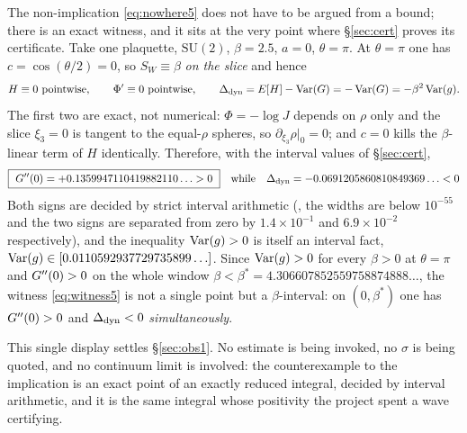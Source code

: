 The non-implication \eqref{eq:nowhere5} does not have to be argued from a bound; there is an
exact witness, and it sits at the very point where \S\ref{sec:cert} proves its certificate. Take
one plaquette, $\mathrm{SU}(2)$, $\beta=2.5$, $a=0$, $\theta=\pi$. At $\theta=\pi$ one has
$c=\cos(\theta/2)=0$, so $S_W\equiv\beta$ \emph{on the slice} and hence
\begin{equation}
H\equiv0\ \text{pointwise},\qquad
\Phi'\equiv0\ \text{pointwise},\qquad
\Dyn=E[H]-\Var(G)=-\Var(G)=-\beta^{2}\Var(g).
\label{eq:wit5}
\end{equation}
The first two are exact, not numerical: $\Phi=-\log J$ depends on $\rho$ only and the slice
$\xi_3=0$ is tangent to the equal-$\rho$ spheres, so $\partial_{\xi_3}\rho|_{0}=0$; and $c=0$ kills
the $\beta$-linear term of $H$ identically. Therefore, with the interval values of
\S\ref{sec:cert},
\begin{equation}
\boxed{\ \Gpp=+0.1359947110419882110\ldots>0\ }
\quad\text{while}\quad
\Dyn=-0.0691205860810849369\ldots<0
\label{eq:witness5}
\end{equation}
Both signs are decided by strict interval arithmetic (\LT, the widths are below $10^{-55}$ and the
two signs are separated from zero by $1.4\times10^{-1}$ and $6.9\times10^{-2}$ respectively), and
the inequality $\operatorname{Var}(g)>0$ is itself an interval fact,
$\operatorname{Var}(g)\in[0.0110592937729735899\ldots]$. Since $\operatorname{Var}(g)>0$ for every $\beta>0$ at $\theta=\pi$
and $G''(0)>0$ on the whole window $\beta<\beta^{*}=4.306607852559758874888\ldots$, the witness
\eqref{eq:witness5} is not a single point but a $\beta$-interval: on
$(0,\beta^{*})$ one has $G''(0)>0$ and $\Delta_{\mathrm{dyn}}<0$ \emph{simultaneously}. \LT{}


This single display settles \S\ref{sec:obs1}. No estimate is being invoked, no $\sigma$ is being
quoted, and no continuum limit is involved: the counterexample to the implication is an exact
point of an exactly reduced integral, decided by interval arithmetic, and it is the same integral
whose positivity the project spent a wave certifying.

